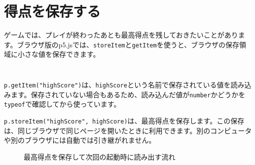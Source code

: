 \section{得点を保存する}

ゲームでは、プレイが終わったあとも最高得点を残しておきたいことがあります。ブラウザ版のp5.jsでは、\texttt{storeItem}と\texttt{getItem}を使うと、ブラウザの保存領域に小さな値を保存できます。

\begin{listing}[htbp]
\inputminted[firstline=1,lastline=27]{ts}{typescript-p5/listings/chapter16/save-score.ts}
\caption{保存してある最高得点を読み込む（\texttt{chapter16/save-score.ts}）}
\label{lst:chapter16-load-high-score}
\end{listing}

\begin{listing}[htbp]
\inputminted[firstline=29,lastline=57]{ts}{typescript-p5/listings/chapter16/save-score.ts}
\caption{最高得点を保存・リセットする（\texttt{chapter16/save-score.ts}）}
\label{lst:chapter16-save-high-score}
\end{listing}

\texttt{p.getItem("highScore")}は、\texttt{highScore}という名前で保存されている値を読み込みます。保存されていない場合もあるため、読み込んだ値が\texttt{number}かどうかを\texttt{typeof}で確認してから使っています。

\texttt{p.storeItem("highScore", highScore)}は、最高得点を保存します。この保存は、同じブラウザで同じページを開いたときに利用できます。別のコンピュータや別のブラウザには自動では引き継がれません。

\begin{figure}[htbp]
    \centering
    \caption{最高得点を保存して次回の起動時に読み出す流れ}
    \label{fig:chapter16-score-storage-flow}
\end{figure}

